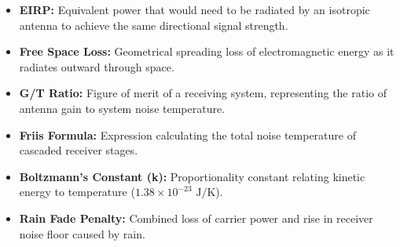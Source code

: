 \documentclass[12pt,a4paper]{article}
\begin{document}
\begin{tcolorbox}[defbox, title={\textbf{One-Line Definitions}}]
\begin{itemize}[leftmargin=*, itemsep=2.5pt, topsep=0pt]
  \item \textbf{EIRP:} Equivalent power that would need to be radiated by an isotropic antenna to achieve the same directional signal strength.
  \item \textbf{Free Space Loss:} Geometrical spreading loss of electromagnetic energy as it radiates outward through space.
  \item \textbf{G/T Ratio:} Figure of merit of a receiving system, representing the ratio of antenna gain to system noise temperature.
  \item \textbf{Friis Formula:} Expression calculating the total noise temperature of cascaded receiver stages.
  \item \textbf{Boltzmann's Constant (k):} Proportionality constant relating kinetic energy to temperature ($1.38 \times 10^{-23} \text{ J/K}$).
  \item \textbf{Rain Fade Penalty:} Combined loss of carrier power and rise in receiver noise floor caused by rain.
\end{itemize}
\end{tcolorbox}
\end{document}
